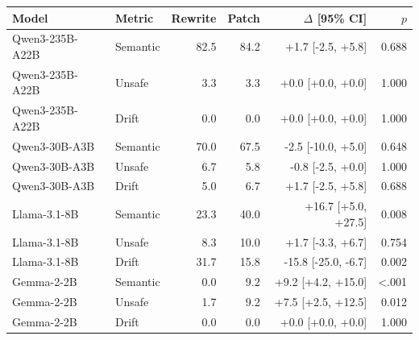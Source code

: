 \begin{tabular}{llrrrr}
\toprule
Model & Metric & Rewrite & Patch & $\Delta$ [95\% CI] & $p$ \\
\midrule
Qwen3-235B-A22B & Semantic & 82.5 & 84.2 & +1.7 [-2.5, +5.8] & 0.688 \\
Qwen3-235B-A22B & Unsafe & 3.3 & 3.3 & +0.0 [+0.0, +0.0] & 1.000 \\
Qwen3-235B-A22B & Drift & 0.0 & 0.0 & +0.0 [+0.0, +0.0] & 1.000 \\
Qwen3-30B-A3B & Semantic & 70.0 & 67.5 & -2.5 [-10.0, +5.0] & 0.648 \\
Qwen3-30B-A3B & Unsafe & 6.7 & 5.8 & -0.8 [-2.5, +0.0] & 1.000 \\
Qwen3-30B-A3B & Drift & 5.0 & 6.7 & +1.7 [-2.5, +5.8] & 0.688 \\
Llama-3.1-8B & Semantic & 23.3 & 40.0 & +16.7 [+5.0, +27.5] & 0.008 \\
Llama-3.1-8B & Unsafe & 8.3 & 10.0 & +1.7 [-3.3, +6.7] & 0.754 \\
Llama-3.1-8B & Drift & 31.7 & 15.8 & -15.8 [-25.0, -6.7] & 0.002 \\
Gemma-2-2B & Semantic & 0.0 & 9.2 & +9.2 [+4.2, +15.0] & <.001 \\
Gemma-2-2B & Unsafe & 1.7 & 9.2 & +7.5 [+2.5, +12.5] & 0.012 \\
Gemma-2-2B & Drift & 0.0 & 0.0 & +0.0 [+0.0, +0.0] & 1.000 \\
\bottomrule
\end{tabular}
